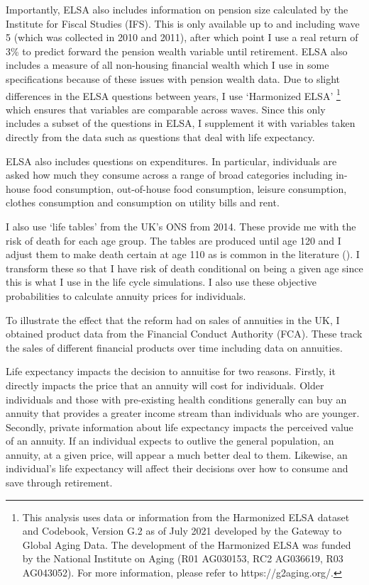 \documentclass[12pt]{article}
\begin{document}
Importantly, ELSA also includes information on pension size calculated by the
Institute for Fiscal Studies (IFS). This is only available up to and including
wave 5 (which was collected in 2010 and 2011), after which point I use a real return
of 3\% to predict forward the pension wealth variable until retirement. ELSA
also includes a measure of all non-housing financial wealth which I use in some
specifications because of these issues with pension wealth data. Due to slight
differences in the ELSA questions between years, I use `Harmonized ELSA'
\footnote{This analysis uses data or information from the Harmonized ELSA
  dataset and Codebook, Version G.2 as of July 2021 developed by the Gateway to
  Global Aging Data. The development of the Harmonized ELSA was funded by the
  National Institute on Aging (R01 AG030153, RC2 AG036619, R03 AG043052). For more
  information, please refer to https://g2aging.org/.} which ensures that variables
are comparable across waves. Since this only includes a subset of the questions
in ELSA, I supplement it with variables taken directly from the data such as
questions that deal with life expectancy.

ELSA also includes questions on expenditures. In particular, individuals are
asked how much they consume across a range of broad categories including
in-house food consumption, out-of-house food consumption, leisure consumption,
clothes consumption and consumption on utility bills and rent.

I also use `life tables' from the UK's ONS from 2014. These provide me with the
risk of death for each age group. The tables are produced until age 120 and I
adjust them to make death certain at age 110 as is common in the literature
(\cite{odea-sturrock-rest-2023}). I transform these so that I have risk of death
conditional on being a given age since this is what I use in the life cycle
simulations. I also use these objective probabilities to calculate annuity
prices for individuals.

To illustrate the effect that the reform had on sales of annuities in the UK, I
obtained product data from the Financial Conduct Authority (FCA). These track the
sales of different financial products over time including data on annuities.

Life expectancy impacts the decision to annuitise for two reasons. Firstly, it
directly impacts the price that an annuity will cost for individuals. Older
individuals and those with pre-existing health conditions generally can buy an
annuity that provides a greater income stream than individuals who are younger.
Secondly, private information about life expectancy impacts the perceived value
of an annuity. If an individual expects to outlive the general population, an
annuity, at a given price, will appear a much better deal to them. Likewise, an
individual's life expectancy will affect their decisions over how to consume and
save through retirement.
\end{document}

